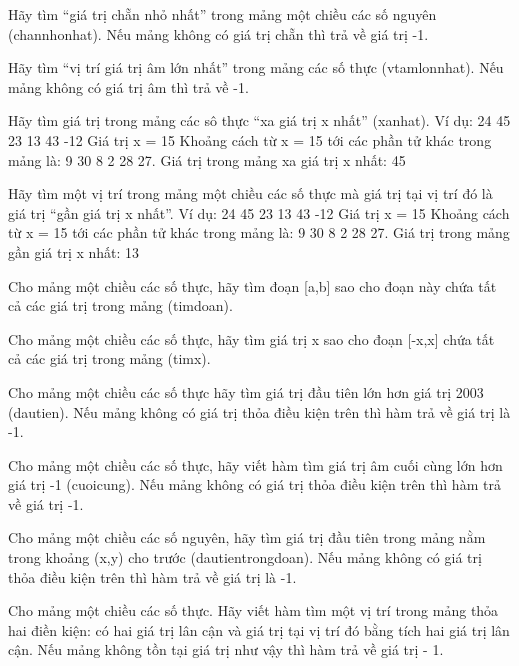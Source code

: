 \begin{problem}
    Hãy tìm “giá trị chẵn nhỏ nhất” trong mảng một chiều các số nguyên (channhonhat). Nếu mảng không có giá trị chẵn thì trả về giá trị -1.
\end{problem}
\begin{problem}
    Hãy tìm “vị trí giá trị âm lớn nhất” trong mảng các số thực (vtamlonnhat). Nếu mảng không có giá trị âm thì trả về -1.
\end{problem}
\begin{problem}
    Hãy tìm giá trị trong mảng các sô thực “xa giá trị x nhất” (xanhat). Ví dụ: 24 45 23 13 43 -12 Giá trị x = 15 Khoảng cách từ x = 15 tới các phần tử khác trong mảng là: 9 30 8 2 28 27. Giá trị trong mảng xa giá trị x nhất: 45
\end{problem}
\begin{problem}
    Hãy tìm một vị trí trong mảng một chiều các số thực mà giá trị tại vị trí đó là giá trị “gần giá trị x nhất”. Ví dụ: 24 45 23 13 43 -12 Giá trị x = 15 Khoảng cách từ x = 15 tới các phần tử khác trong mảng là: 9 30 8 2 28 27. Giá trị trong mảng gần giá trị x nhất: 13
\end{problem}
\begin{problem}
    Cho mảng một chiều các số thực, hãy tìm đoạn [a,b] sao cho đoạn này chứa tất cả các giá trị trong mảng (timdoan).
\end{problem}
\begin{problem}
    Cho mảng một chiều các số thực, hãy tìm giá trị x sao cho đoạn [-x,x] chứa tất cả các giá trị trong mảng (timx).
\end{problem}
\begin{problem}
    Cho mảng một chiều các số thực hãy tìm giá trị đầu tiên lớn hơn giá trị 2003 (dautien). Nếu mảng không có giá trị thỏa điều kiện trên thì hàm trả về giá trị là -1.
\end{problem}
\begin{problem}
    Cho mảng một chiều các số thực, hãy viết hàm tìm giá trị âm cuối cùng lớn hơn giá trị -1 (cuoicung). Nếu mảng không có giá trị thỏa điều kiện trên thì hàm trả về giá trị -1.
\end{problem}
\begin{problem}
    Cho mảng một chiều các số nguyên, hãy tìm giá trị đầu tiên trong mảng nằm trong khoảng (x,y) cho trước (dautientrongdoan). Nếu mảng không có giá trị thỏa điều kiện trên thì hàm trả về giá trị là -1.
\end{problem}
\begin{problem}
    Cho mảng một chiều các số thực. Hãy viết hàm tìm một vị trí trong mảng thỏa hai điền kiện: có hai giá trị lân cận và giá trị tại vị trí đó bằng tích hai giá trị lân cận. Nếu mảng không tồn tại giá trị như vậy thì hàm trả về giá trị - 1.
\end{problem}
